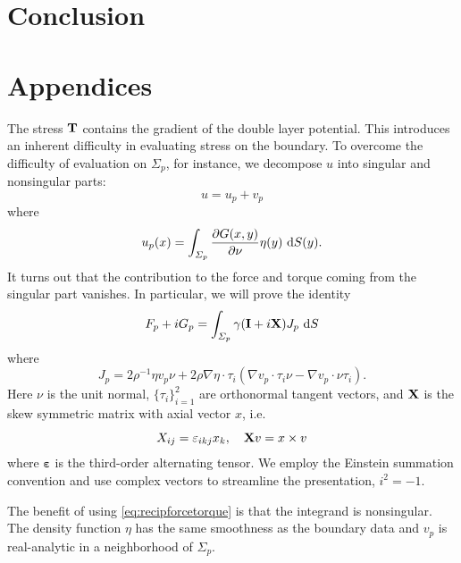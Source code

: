 \documentclass[lineno]{jfm}
\begin{document}
\section{\label{conclusion}Conclusion}


\begin{acknowledgments}
\end{acknowledgments}

\appendix

\section{Appendices}
The stress ${\bf T}$ contains the gradient of the double layer potential. This 
introduces an inherent difficulty in evaluating stress on the boundary.
To overcome the difficulty of evaluation on $\Sigma_p$, for instance, we decompose $u$ into singular and nonsingular parts:
\begin{equation}
u = u_p + v_p
\end{equation}
where  
\begin{equation}
u_p(x) = \int_{\Sigma_p} \frac{\partial G(x,y)}{\partial \nu} \eta(y) \,\dif S(y).
\end{equation}
It turns out that the contribution to the force and torque coming from the singular
part vanishes. In particular, we will prove the identity
\begin{equation}
\label{eq:recipforcetorque}
F_p + iG_p= \int_{\Sigma_p} \gamma ({\bf I}+i{\bf X})J_{p} \,\dif S
\end{equation}
where
 \begin{equation}
\label{eq:jumpstress1}
J_{p} = 2\rho^{-1} \eta  v_p \nu 
+ 2\rho \nabla \eta \cdot \tau_i(\nabla v_p \cdot \tau_i \nu -  \nabla v_p \cdot \nu \tau_i).
\end{equation}
Here $\nu$ is the unit normal, $\{\tau_i\}_{i=1}^2$ are orthonormal tangent vectors,
and ${\bf X}$ is the skew symmetric matrix with axial vector $x$, i.e.
\[X_{ij} = \varepsilon_{ikj}x_k,\quad {\bf X}v = x\times v\]
where $\boldsymbol{\varepsilon}$ is the third-order alternating tensor.
We employ the Einstein summation convention and use complex vectors to streamline the presentation, $i^2 = -1$.

The benefit of using \eqref{eq:recipforcetorque} is that the integrand  is nonsingular.
The density function $\eta$ has the same smoothness as the boundary data
and $v_p$ is real-analytic in a neighborhood of $\Sigma_p$.
\end{document}
